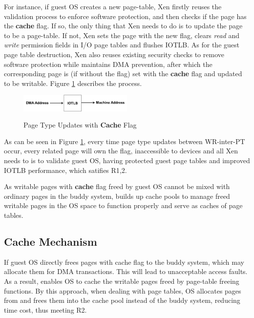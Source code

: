 For instance, if guest OS creates a new page-table, Xen firstly reuses the validation process to enforce software protection, and then checks if the page has the \textbf{cache} flag. If so, the only thing that Xen needs to do is to update the page to be a page-table. If not, Xen sets the page with the new flag, clears \emph{read} and \emph{write} permission fields in I/O page tables and flushes IOTLB. As for the guest page table destruction, Xen also reuses existing security checks to remove software protection while maintains DMA prevention, after which the corresponding page is (if without the flag) set with the \textbf{cache} flag and updated to be writable. Figure \ref{fig:cache-flag} describes the process.

\begin{figure}[ht]
\centering
\includegraphics[width=0.5\textwidth]{image/design/cache-flag.png} \\
\caption{Page Type Updates with \textbf{Cache} Flag}
\label{fig:cache-flag}
\end{figure}

As can be seen in Figure \ref{fig:cache-flag}, every time page type updates between WR-inter-PT occur, every related page will own the flag, inaccessible to devices and all Xen needs to is to validate guest OS, having protected guest page tables and improved IOTLB performance, which satifies R1,2.

As writable pages with \textbf{cache} flag freed by guest OS cannot be mixed with ordinary pages in the buddy system, \name builds up cache pools to manage freed writable pages in the OS space to function properly and serve as caches of page tables.

\subsection{Cache Mechanism}
If guest OS directly frees pages with cache flag to the buddy system, which may allocate them for DMA transactions. This will lead to unacceptable access faults. As a result, \name enables OS to cache the writable pages freed by page-table freeing functions. By this approach, when dealing with page tables, OS allocates pages from and frees them into the cache pool instead of the buddy system, reducing time cost, thus meeting R2.

